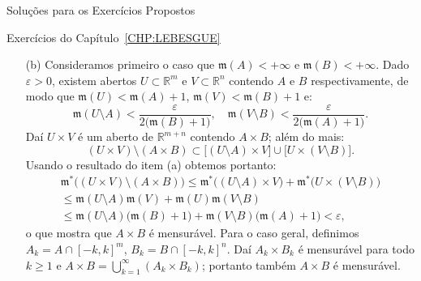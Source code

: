 \documentclass[oneside,final,11pt]{amsbook}
\newcommand{\R}{\mathds R}
\newcommand{\leb}{\mathfrak m}
\theoremstyle{remark}\newtheorem{exercise}{Exercício}[chapter]
\theoremstyle{remark}\newtheorem{*exercise}[exercise]{\hbox to 0pt{\hskip 0pt minus 1fil*}Exercício}
\theoremstyle{definition}\newtheorem{exdefin}{Definição}[chapter]
\theoremstyle{plain}\newtheorem{teo}{Teorema}[section]
\theoremstyle{plain}\newtheorem{lem}[teo]{Lema}
\theoremstyle{plain}\newtheorem{prop}[teo]{Proposição}
\theoremstyle{plain}\newtheorem{cor}[teo]{Corolário}
\theoremstyle{definition}\newtheorem{defin}[teo]{Definição}
\theoremstyle{remark}\newtheorem{rem}[teo]{Observação}
\theoremstyle{definition}\newtheorem{notation}[teo]{Notação}
\theoremstyle{definition}\newtheorem{convention}[teo]{Convenção}
\theoremstyle{definition}\newtheorem{example}[teo]{Exemplo}
\numberwithin{section}{chapter}
\numberwithin{equation}{section}
\begin{document}
\begin{chapter}{Soluções para os Exercícios Propostos}
\begin{section}{Exercícios do Capítulo~\ref{CHP:LEBESGUE}}
\begin{itemize}
\item[(b)] Consideramos primeiro o caso que $\leb(A)<+\infty$ e $\leb(B)<+\infty$.
Dado $\varepsilon>0$, existem abertos $U\subset\R^m$ e $V\subset\R^n$ contendo $A$ e $B$
respectivamente, de modo que $\leb(U)<\leb(A)+1$, $\leb(V)<\leb(B)+1$ e:
\[\leb(U\setminus A)<\frac\varepsilon{2\big(\leb(B)+1\big)},
\quad\leb(V\setminus B)<\frac\varepsilon{2\big(\leb(A)+1\big)}.\]
Daí $U\times V$ é um aberto de $\R^{m+n}$ contendo $A\times B$; além do mais:
\[(U\times V)\setminus(A\times B)\subset\big[(U\setminus A)\times V\big]\cup\big[U\times(V\setminus B)\big].\]
Usando o resultado do item (a) obtemos portanto:
\begin{multline*}
\leb^*\big((U\times V)\setminus(A\times B)\big)\le\leb^*\big((U\setminus A)\times V\big)+\leb^*\big(U\times(V\setminus B)\big)\\
\le\leb(U\setminus A)\leb(V)+\leb(U)\leb(V\setminus B)\\\le
\leb(U\setminus A)\big(\leb(B)+1\big)+\leb(V\setminus B)\big(\leb(A)+1\big)<\varepsilon,
\end{multline*}
o que mostra que $A\times B$ é mensurável. Para o caso geral, definimos $A_k=A\cap[-k,k]^m$, $B_k=B\cap[-k,k]^n$.
Daí $A_k\times B_k$ é mensurável para todo $k\ge1$ e $A\times B=\bigcup_{k=1}^\infty(A_k\times B_k)$; portanto
também $A\times B$ é mensurável.

\smallskip


\end{itemize}
\end{section}
\end{chapter}
\end{document}
